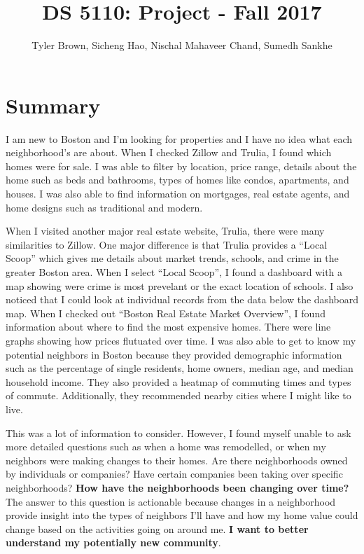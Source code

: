 \documentclass[12pt]{article}
\title{DS 5110: Project - Fall 2017}
\author{Tyler Brown, Sicheng Hao, Nischal Mahaveer Chand, Sumedh Sankhe}
\date{ }
\begin{document}
\maketitle

\section{Summary}

I am new to Boston and I'm looking for properties and I have no idea
what each neighborhood's are about. When I checked Zillow and Trulia,
I found which homes were for sale. I was able to filter by location,
price range, details about the home such as beds and bathrooms, types
of homes like condos, apartments, and houses. I was also able to find
information on mortgages, real estate agents, and home designs such
as traditional and modern.

When I visited another major real estate website, Trulia, there were
many similarities to Zillow. One major difference is that Trulia
provides a ``Local Scoop'' which gives me details about market trends,
schools, and crime in the greater Boston area. When I select ``Local
Scoop'', I found a dashboard with a map showing were crime is most
prevelant or the exact location of schools. I also noticed that I could
look at individual records from the data below the dashboard map. When
I checked out ``Boston Real Estate Market Overview'', I found information
about where to find the most expensive homes. There were line graphs
showing how prices flutuated over time. I was also able to get to know
my potential neighbors in Boston because they provided demographic
information such as the percentage of single residents, home owners,
median age, and median household income. They also provided a heatmap
of commuting times and types of commute. Additionally, they recommended
nearby cities where I might like to live.

This was a lot of information to consider. However, I found myself unable
to ask more detailed questions such as when a home was remodelled, or
when my neighbors were making changes to their homes. Are there
neighborhoods owned by individuals or companies? Have certain companies
been taking over specific neighborhoods? \textbf{How have the
  neighborhoods been changing over time?} The answer to this question
is actionable because changes in a neighborhood provide insight into
the types of neighbors I'll have and how my home value could change
based on the activities going on around me. \textbf{I want to better understand my potentially new community}.
\end{document}
